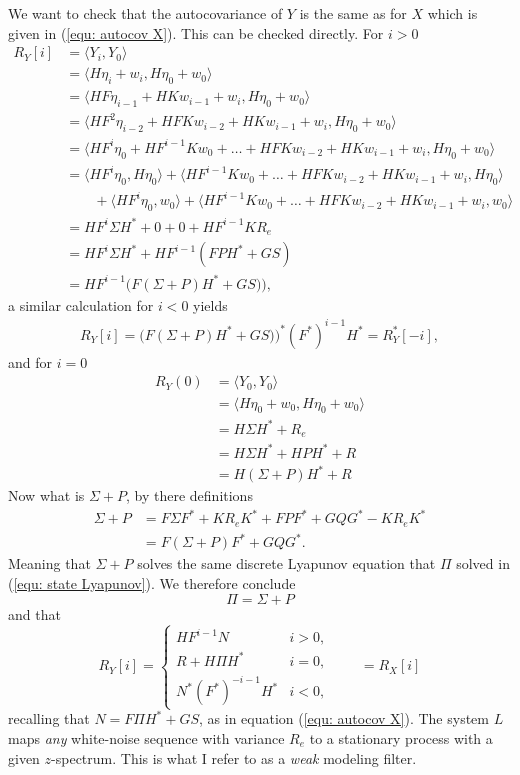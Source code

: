 \documentclass[12pt]{amsart}
\begin{document}
We want to check that the autocovariance of $Y$ is the same as for $X$ which is given in (\ref{equ: autocov X}). This can be checked directly. For $i>0$
\begin{align*}
R_Y[i] &= \langle Y_i, Y_0 \rangle \\
	&= \langle H\eta_i+w_i, H\eta_0 + w_0 \rangle \\
	&= \langle HF\eta_{i-1}+HKw_{i-1} + w_i, H\eta_0 + w_0 \rangle \\
	&= \langle HF^2\eta_{i-2}+HFKw_{i-2} + HKw_{i-1} + w_i, H\eta_0 + w_0 \rangle \\
	&= \langle HF^i\eta_{0}+HF^{i-1}Kw_{0} + \dots + HFKw_{i-2} + HKw_{i-1} + w_i, H\eta_0 + w_0 \rangle \\
	&= \langle HF^i\eta_{0}, H\eta_0\rangle + \langle HF^{i-1}Kw_{0} + \dots + HFKw_{i-2} + HKw_{i-1} + w_i, H\eta_0 \rangle \\
	&\qquad +\langle HF^i\eta_{0}, w_0\rangle + \langle HF^{i-1}Kw_{0} + \dots + HFKw_{i-2} + HKw_{i-1} + w_i, w_0 \rangle\\
	&= HF^i\Sigma H^* + 0 + 0 + HF^{i-1}KR_e\\
	&= HF^i\Sigma H^* + HF^{i-1}(FPH^* + GS)\\
	&= HF^{i-1}\big(F(\Sigma + P)H^* + GS)\big),
\end{align*}
a similar calculation for $i<0$ yields
\begin{align*}
R_Y[i] = \big(F(\Sigma + P)H^* + GS)\big)^*(F^*)^{i-1}H^* = R^*_Y[-i],
\end{align*}
and for $i=0$
\begin{align*}
	 R_Y(0) &= \langle Y_0, Y_0 \rangle \\
	 &= \langle H\eta_0+w_0, H\eta_0 + w_0 \rangle \\
	 &= H\Sigma H^* + R_e \\
	 &= H\Sigma H^* + HPH^* + R\\
	 &= H(\Sigma + P)H^* + R
\end{align*}
Now what is $\Sigma + P$, by there definitions 
\begin{align*}
\Sigma + P &= F\Sigma F^* + KR_eK^* + FPF^* + GQG^* - KR_eK^*\\
&= F(\Sigma + P)F^* + GQG^*.
\end{align*}
Meaning that $\Sigma + P$ solves the same discrete Lyapunov equation that $\Pi$ solved in (\ref{equ: state Lyapunov}). We therefore conclude $$\Pi = \Sigma + P$$ and that 
\begin{equation}
R_Y[i] = \begin{cases}
HF^{i-1}N & i>0, \\
R + H\Pi H^* & i = 0, \\
N^*(F^*)^{-i-1}H^* & i < 0,
\end{cases} \qquad= R_X[i]
\label{equ: autocov Y}
\end{equation}
recalling that  $N= F\Pi H^* + GS$, as in equation (\ref{equ: autocov X}). 
The system $L$ maps \emph{any} white-noise sequence with variance $R_e$ to a stationary process with a given $z$-spectrum. This is what I refer to as a \emph{weak} modeling filter. 
\end{document}
